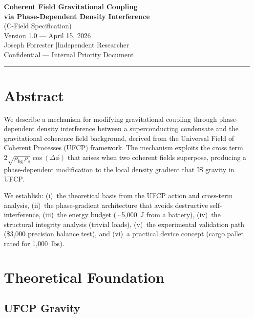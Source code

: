 \documentclass[11pt, a4paper]{article}
\begin{document}
\begin{center}
  {\LARGE \textbf{Coherent Field Gravitational Coupling}}\\[4pt]
  {\LARGE \textbf{via Phase-Dependent Density Interference}}\\[6pt]
  {\large (C-Field Specification)}\\[8pt]
  {\color{nm-gray}\small Version 1.0 --- April 15, 2026}\\[4pt]
  {\color{nm-gray}\small Joseph Forrester \quad|\quad Independent Researcher}\\[4pt]
  {\color{nm-gray}\small Confidential --- Internal Priority Document}
\end{center}

\vspace{1em}
\hrule
\vspace{1em}

\section*{Abstract}

We describe a mechanism for modifying gravitational coupling
through phase-dependent density interference between a
superconducting condensate and the gravitational coherence
field background, derived from the Universal Field of Coherent
Processes (UFCP) framework. The mechanism exploits the cross
term $2\sqrt{\rho_{\text{bg}}\,\rho_s}\cos(\Delta\phi)$ that
arises when two coherent fields superpose, producing a
phase-dependent modification to the local density gradient that
IS gravity in UFCP.

We establish: (i)~the theoretical basis from the UFCP action
and cross-term analysis, (ii)~the phase-gradient architecture
that avoids destructive self-interference, (iii)~the energy
budget ($\sim$5{,}000~J from a battery), (iv)~the structural
integrity analysis (trivial loads), (v)~the experimental
validation path (\$3{,}000 precision balance test), and
(vi)~a practical device concept (cargo pallet rated for
1{,}000~lbs).

\tableofcontents

\section{Theoretical Foundation}

\subsection{UFCP Gravity}
\end{document}
